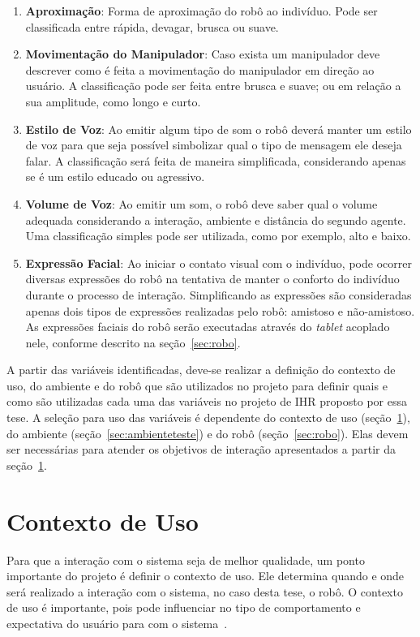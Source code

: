 \begin{enumerate}
	\item \textbf{Aproximação}: Forma de aproximação do robô ao indivíduo. Pode ser classificada entre rápida, devagar, brusca ou suave.
	\item \textbf{Movimentação do Manipulador}: Caso exista um manipulador deve descrever como é feita a movimentação do manipulador em direção ao usuário. A classificação pode ser feita entre brusca e suave; ou em relação a sua amplitude, como longo e curto.
	\item \textbf{Estilo de Voz}: Ao emitir algum tipo de som o robô deverá manter um estilo de voz para que seja possível simbolizar qual o tipo de mensagem ele deseja falar. A classificação será feita de maneira simplificada, considerando apenas se é um estilo educado ou agressivo.
	\item \textbf{Volume de Voz}: Ao emitir um som, o robô deve saber qual o volume adequada considerando a interação, ambiente e distância do segundo agente. Uma classificação simples pode ser utilizada, como por exemplo, alto e baixo.
	\item \textbf{Expressão Facial}: Ao iniciar o contato visual com o indivíduo, pode ocorrer diversas expressões do robô na tentativa de manter o conforto do indivíduo durante o processo de interação. Simplificando as expressões são consideradas apenas dois tipos de expressões realizadas pelo robô: amistoso e não-amistoso. As expressões faciais do robô serão executadas através do \emph{tablet} acoplado nele, conforme descrito na seção~\ref{sec:robo}.
\end{enumerate}

A partir das variáveis identificadas, deve-se realizar a definição do contexto de uso, do ambiente e do robô que são utilizados no projeto para definir quais e como são utilizadas cada uma das variáveis no projeto de IHR proposto por essa tese. A seleção para uso das variáveis é dependente do contexto de uso (seção~\ref{sec:contextouso}), do ambiente (seção~\ref{sec:ambienteteste}) e do robô (seção~\ref{sec:robo}). Elas devem ser necessárias para atender os objetivos de interação apresentados a partir da seção~\ref{sec:contextouso}.

\section{Contexto de Uso}
\label{sec:contextouso}
Para que a interação com o sistema seja de melhor qualidade, um ponto importante do projeto é definir o contexto de uso. Ele determina quando e onde será realizado a interação com o sistema, no caso desta tese, o robô. O contexto de uso é importante, pois pode influenciar no tipo de comportamento e expectativa do usuário para com o sistema~\cite{barbosa:2010}.

